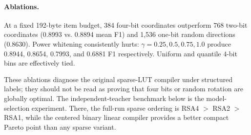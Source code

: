\paragraph{Ablations.} At a fixed 192-byte item budget, 384 four-bit coordinates outperform 768 two-bit coordinates (0.8993 vs. 0.8894 mean F1) and 1,536 one-bit random directions (0.8630). Power whitening consistently hurts: $\gamma=0.25,0.5,0.75,1.0$ produce 0.8944, 0.8654, 0.7993, and 0.6881 F1 respectively. Uniform and quantile 4-bit bins are effectively tied.

These ablations diagnose the original sparse-LUT compiler under structured labels; they should not be read as proving that four bits or random rotation are globally optimal. The independent-teacher benchmark below is the model-selection experiment. There, the full-run sparse ordering is RSA4 $>$ RSA2 $>$ RSA1, while the centered binary linear compiler provides a better compact Pareto point than any sparse \rsa variant.
